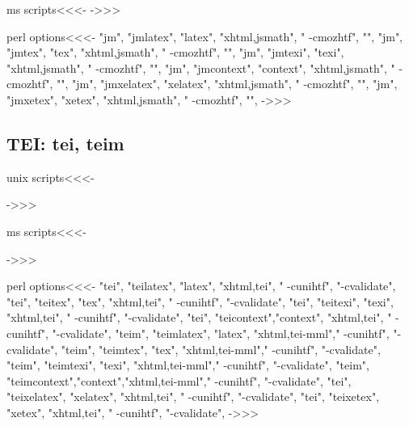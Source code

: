 \documentclass{article}
\begin{document}
\<ms scripts\><<<-
->>>


\<perl options\><<<-
 "jm", "jmlatex",   "latex",   "xhtml,jsmath", " -cmozhtf", "",
 "jm", "jmtex",     "tex",     "xhtml,jsmath", " -cmozhtf", "",
 "jm", "jmtexi",    "texi",    "xhtml,jsmath", " -cmozhtf", "",
 "jm", "jmcontext", "context", "xhtml,jsmath", " -cmozhtf", "",
 "jm", "jmxelatex",   "xelatex",   "xhtml,jsmath", " -cmozhtf", "",
 "jm", "jmxetex",     "xetex",     "xhtml,jsmath", " -cmozhtf", "",
->>>








\subsection{TEI: tei, teim}

\<unix scripts\><<<-

->>>

\<ms scripts\><<<-

->>>


\<perl options\><<<-
 "tei",  "teilatex",  "latex",   "xhtml,tei",    " -cunihtf",  "-cvalidate",
 "tei",  "teitex",    "tex",     "xhtml,tei",    " -cunihtf",  "-cvalidate",
 "tei",  "teitexi",   "texi",    "xhtml,tei",    " -cunihtf",  "-cvalidate",
 "tei",  "teicontext","context", "xhtml,tei",    " -cunihtf",  "-cvalidate",
 "teim", "teimlatex", "latex",   "xhtml,tei-mml"," -cunihtf",  "-cvalidate",
 "teim", "teimtex",   "tex",     "xhtml,tei-mml"," -cunihtf",  "-cvalidate",
 "teim", "teimtexi",  "texi",    "xhtml,tei-mml"," -cunihtf",  "-cvalidate",
 "teim", "teimcontext","context","xhtml,tei-mml"," -cunihtf",  "-cvalidate",
 "tei",  "teixelatex",  "xelatex",   "xhtml,tei",    " -cunihtf",  "-cvalidate",
 "tei",  "teixetex",    "xetex",     "xhtml,tei",    " -cunihtf",  "-cvalidate",
->>>
\end{document}
